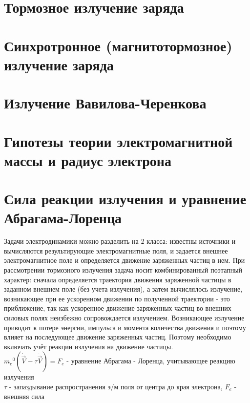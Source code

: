 \begin{multicols*}{2}
		\section{Тормозное излучение заряда}
		
		\section{Синхротронное (магнитотормозное) излучение заряда}
		
		\section{Излучение Вавилова-Черенкова}
		
		\section{Гипотезы теории электромагнитной массы и радиус электрона}
		
		\section{Сила реакции излучения и уравнение Абрагама-Лоренца}
		Задачи электродинамики можно разделить на 2 класса: известны источники и вычисляются результирующие электромагнитные поля, и задается внешнее электромагнитное поле и определяется движение заряженных частиц в нем. При рассмотрении тормозного излучения задача носит комбинированный поэтапный характер: сначала определяется траектория движения заряженной частицы в заданном внешнем поле (без учета излучения), а затем вычислялось излучение, возникающее при ее ускоренном движении по полученной траектории - это приближение, так как ускоренное движение заряженных частиц во внешних силовых полях неизбежно сопровождается излучением. Возникающее излучение приводит к потере энергии, импульса и момента количества движения и поэтому влияет на последующее движение заряженных частиц. Поэтому необходимо включать учёт реакции излучения на движение частицы. \\
		${m_e}^0(\dot{\vec{V}} - \tau \ddot{\vec{V}}) = F_e$ - уравнение Абрагама - Лоренца, учитывающее реакцию излучения\\
		$\tau$ - запаздывание распространения э/м поля от центра до края электрона, \quad $F_e$ - внешняя сила

		
	\end{multicols*}

